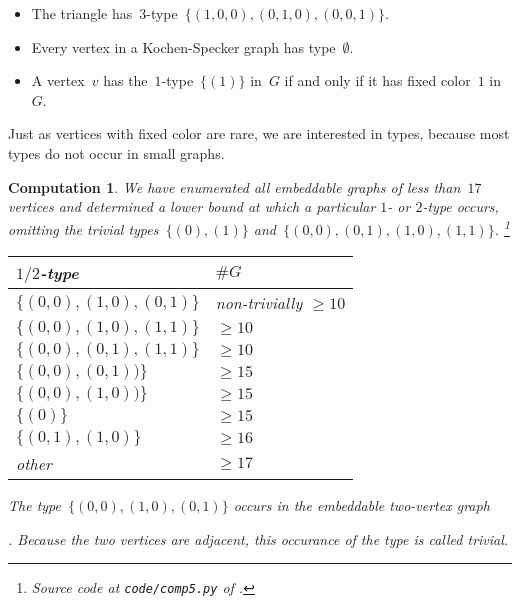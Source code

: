 \documentclass{report}
\newtheorem{comp}{Computation}[section]
\begin{document}
\begin{example}
\begin{itemize}
\item The triangle has~$3$-type~$\{(1,0,0), (0,1,0), (0,0,1)\}$.
\item Every vertex in a Kochen-Specker graph has type~$\emptyset$.
\item
    A vertex~$v$ has the~$1$-type~$\{(1)\}$ in~$G$ if and only if
        it has fixed color~$1$ in~$G$.
\end{itemize}
\end{example}

Just as vertices with fixed color are rare,
we are interested in types,
because most types do not occur in small graphs.

\begin{comp}\label{comp:types}
    We have enumerated all embeddable graphs of less than~$17$ vertices
    and determined a lower bound at which a particular $1$- or $2$-type occurs,
    omitting the trivial types~$\{(0),(1)\}$
    and~$\{(0,0),(0,1),(1,0),(1,1)\}$.%
        \footnote{Source code at \texttt{code/comp5.py} of \cite{GH}.}
    \begin{center}
    \begin{tabular}{ll}
        $1/2$-type & $\#G$ \\ \hline
        $\{(0,0), (1,0), (0,1)\}$ &
            non-trivially $\geq 10$\\ 
        $\{(0,0), (1,0), (1,1)\}$ & $\geq 10$ \\
        $\{(0,0), (0,1), (1,1)\}$ & $\geq 10$ \\
        $\{(0,0), (0,1))\}$ & $\geq 15$ \\
        $\{(0,0), (1,0))\}$ & $\geq 15$ \\
        $\{(0)\}$ & $\geq 15$ \\
        $\{(0,1),(1,0)\}$ & $\geq 16$ \\
        other & $\geq 17$
    \end{tabular}
    \end{center}
    The type~$\{(0,0),(1,0),(0,1)\}$ occurs in the embeddable two-vertex
    graph
    .
    Because the two vertices are adjacent, this occurance of
    the type is called trivial.
\end{comp}
\end{document}

